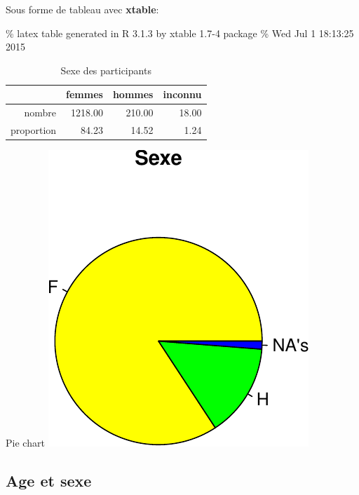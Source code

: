 \documentclass[]{article}
\begin{document}
Sous forme de tableau avec \textbf{xtable}:

\% latex table generated in R 3.1.3 by xtable 1.7-4 package \% Wed Jul 1
18:13:25 2015

\begin{table}[ht]
\centering
\begin{tabular}{rrrr}
  \hline
 & femmes & hommes & inconnu \\ 
  \hline
nombre & 1218.00 & 210.00 & 18.00 \\ 
  proportion & 84.23 & 14.52 & 1.24 \\ 
   \hline
\end{tabular}
\caption{Sexe des participants} 
\label{sexe}
\end{table}

Pie chart
\includegraphics{qs_etudiants_files/figure-latex/pie_sexe-1.pdf}

\subsection{Age et sexe}\label{age-et-sexe}
\end{document}
